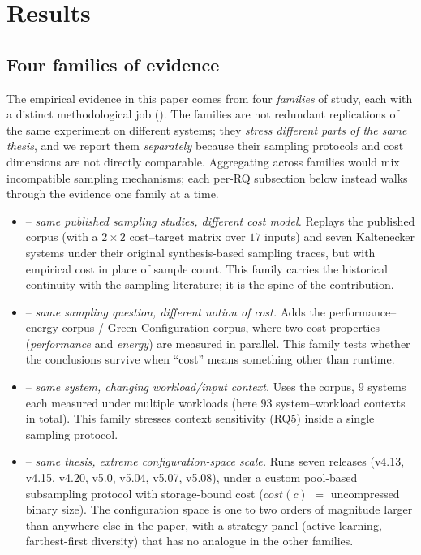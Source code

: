 \section{Results}
\label{sec:results}

\subsection{Four families of evidence}
\label{subsec:families}

The empirical evidence in this paper comes from four \emph{families} of
study, each with a distinct methodological job
(). The families are not redundant
replications of the same experiment on different systems; they
\emph{stress different parts of the same thesis}, and we report them
\emph{separately} because their sampling protocols and cost dimensions
are not directly comparable. Aggregating across families would mix
incompatible sampling mechanisms; each per-RQ subsection below instead
walks through the evidence one family at a time.

\begin{itemize}
    \item \StudyReplication -- \emph{same published sampling studies,
    different cost model.} Replays the published \dsXmat corpus
    (with a $2\!\times\!2$ cost--target matrix over $17$ inputs) and
    seven Kaltenecker \etal{} systems under their original
    synthesis-based sampling traces, but with empirical cost in place
    of sample count. This family carries the historical continuity
    with the sampling literature; it is the spine of the
    contribution.
    \item \StudyEnergy -- \emph{same sampling question, different
    notion of cost.} Adds the performance--energy corpus / Green Configuration
    corpus, where two cost properties (\emph{performance} and
    \emph{energy}) are measured in parallel. This family tests whether
    the conclusions survive when ``cost'' means something other than
    runtime.
    \item \StudyWorkload -- \emph{same system, changing
    workload/input context.} Uses the \dsWLI corpus, $9$ systems
    each measured under multiple workloads (here
    $93$ system--workload contexts in total). This family stresses
    context sensitivity (RQ5) inside a single sampling protocol.
    \item \StudyLinux -- \emph{same thesis, extreme
    configuration-space scale.} Runs seven \dsTux releases (v4.13,
    v4.15, v4.20, v5.0, v5.04, v5.07, v5.08), under a custom pool-based
    subsampling
    protocol with storage-bound cost ($\mathit{cost}(c)$ $=$
    uncompressed binary size). The configuration space is one to two
    orders of magnitude larger than anywhere else in the paper, with
    a strategy panel (active learning, farthest-first diversity) that
    has no analogue in the other families.
\end{itemize}

